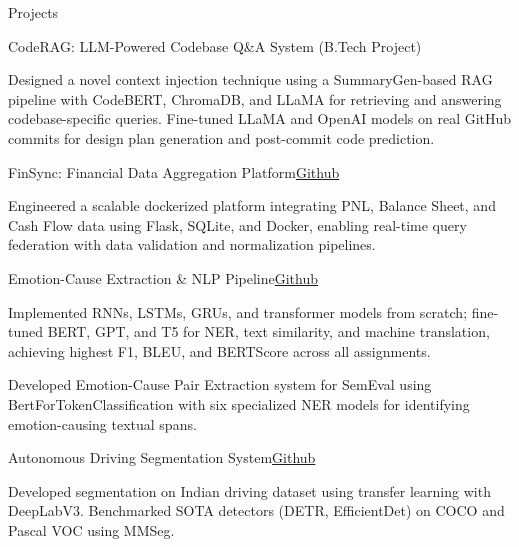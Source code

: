 \documentclass[10pt]{resume}
\begin{document}
    \begin{rSection}{Projects}

        \begin{rSubsection}{CodeRAG: LLM-Powered Codebase Q\&A System (B.Tech Project)}{}
            \item Designed a novel context injection technique using a SummaryGen-based RAG pipeline with CodeBERT, ChromaDB, and LLaMA for retrieving and answering codebase-specific queries. Fine-tuned LLaMA and OpenAI models on real GitHub commits for design plan generation and post-commit code prediction.
        \end{rSubsection}

        \begin{rSubsection}{FinSync: Financial Data Aggregation Platform}{\href{https://github.com/UtsvGrg/FinSync-Financial-Aggregation-Platform}{Github}}
            \item Engineered a scalable dockerized platform integrating PNL, Balance Sheet, and Cash Flow data using Flask, SQLite, and Docker, enabling real-time query federation with data validation and normalization pipelines.
        \end{rSubsection}

        \begin{rSubsection}{Emotion-Cause Extraction \& NLP Pipeline}{\href{https://github.com/UtsvGrg/Natural_Language_Processing}{Github}}
            \item Implemented RNNs, LSTMs, GRUs, and transformer models from scratch; fine-tuned BERT, GPT, and T5 for NER, text similarity, and machine translation, achieving highest F1, BLEU, and BERTScore across all assignments.
            \item Developed Emotion-Cause Pair Extraction system for SemEval using BertForTokenClassification with six specialized NER models for identifying emotion-causing textual spans.
        \end{rSubsection}

        \begin{rSubsection}{Autonomous Driving Segmentation System}{\href{https://github.com/UtsvGrg/CV_Retinal_Vessel_Segmentation}{Github}}
            \item Developed segmentation on Indian driving dataset using transfer learning with DeepLabV3. Benchmarked SOTA detectors (DETR, EfficientDet) on COCO and Pascal VOC using MMSeg.
        \end{rSubsection}

    \end{rSection}
\end{document}

